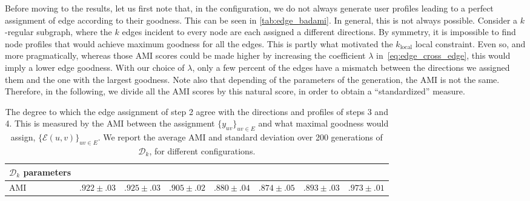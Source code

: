 Before moving to the results, let us first note that,
in the  configuration, we do not always
generate user profiles leading to a perfect assignment of edge according to their goodness. This can
be seen in \autoref{tab:edge_badami}. In
general, this is not always possible. Consider a $k$-regular subgraph, where the $k$ edges incident
to every node are each assigned a different directions. By symmetry, it is impossible to find node
profiles that would achieve maximum goodness for all the edges. This is partly what motivated the
$k_{\mathrm{local}}$ local constraint. Even so, and more pragmatically, whereas those AMI scores
could be made higher by increasing the coefficient $\lambda$ in~\eqref{eq:edge_cross_edge}, this would
imply a lower edge goodness. With our choice of $\lambda$, only a few percent of the edges have a mismatch
between the directions we assigned them and the one with the largest goodness. Note also that
depending of the parameters of the generation, the AMI is not the same. Therefore, in the following,
we divide all the AMI scores by this natural score, in order to obtain a \enquote{standardized} measure.

\begin{table}[htb]
  \centering
  \small
  \caption{The degree to which the edge assignment of step 2 agree with the directions and profiles
    of steps 3 and 4. This is measured by the AMI between the assignment $\{y_{uv}\}_{uv \in E}$ and
    what maximal goodness would assign, \ie{} $\{\mathcal{E}(u,v)\}_{uv \in E}$. We report the
    average AMI and standard deviation over 200 generations of $\mathcal{D}_k$, for different
    configurations.  \label{tab:edge_badami}}
\begin{tabular}{lccccccc}
  \toprule
  {$\mathcal{D}_k$ parameters}  & {{}}   & {\smallk{}}    & {\largek{}}    & {\smallo{}}    & {\largeo{}}    & {\fdirs{}}     & {\larged{}}    \\
  \midrule
  AMI & $.922 \pm .03$ & $.925 \pm .03$ & $.905 \pm .02$ & $.880 \pm .04$ & $.874 \pm .05$ & $.893 \pm .03$ & $.973 \pm .01$ \\
  \bottomrule
\end{tabular}
\end{table}

